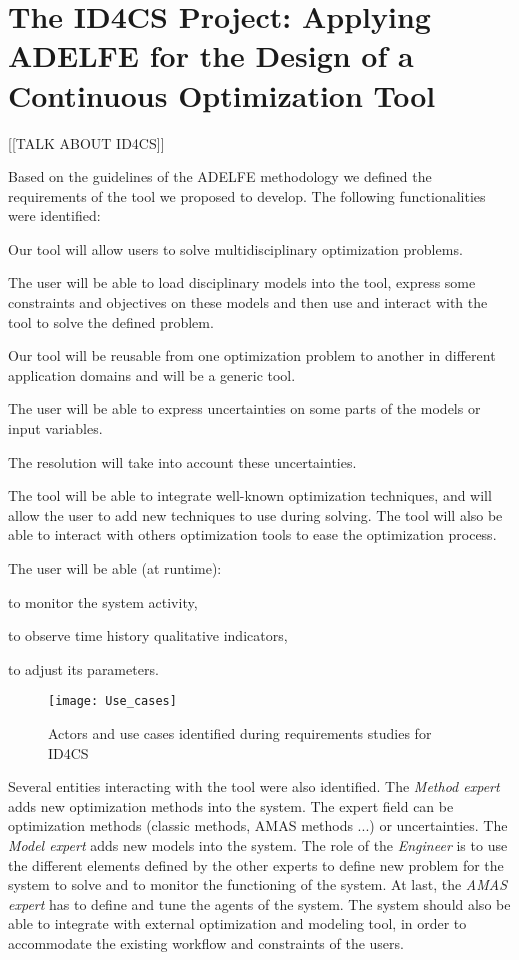 \section{The ID4CS Project: Applying ADELFE for the Design of a Continuous Optimization Tool}

[[TALK ABOUT ID4CS]]

Based on the guidelines of the ADELFE methodology we defined the requirements of the tool we proposed to develop. The following functionalities were identified:
\begin{compactitem}
\item Our tool will allow users to solve multidisciplinary optimization problems.
\item The user will be able to load disciplinary models into the tool, express some constraints and objectives on these models and then use and interact with the tool to solve the defined problem.
\item Our tool will be reusable from one optimization problem to another in different application domains and will be a generic tool.
\item The user will be able to express uncertainties on some parts of the models or input variables.
\item The resolution will take into account these uncertainties.
\item The tool will be able to integrate well-known optimization techniques, and will allow the user to add new techniques to use during solving. The tool will also be able to interact with others optimization tools to ease the optimization process.

\item The user will be able (at runtime):
	\begin{compactitem}
	\item to monitor the system activity,
	\item to observe time history qualitative indicators,
	\item to adjust its parameters.
	\end{compactitem}
\end{compactitem}

\begin{figure}
\centering
\texttt{[image: Use\_cases]}
\caption{Actors and use cases identified during requirements studies for ID4CS}\label{Use_cases}
\end{figure}

Several entities interacting with the tool were also identified. The \emph{Method expert} adds new optimization methods into the system. The expert field can be optimization methods (classic methods, AMAS methods ...) or uncertainties. The \emph{Model expert} adds new models into the system. The role of the \emph{Engineer} is to use the different elements defined by the other experts to define new problem for the system to solve and to monitor the functioning of the system. At last, the \emph{AMAS expert} has to define and tune the agents of the system. The system should also be able to integrate with external optimization and modeling tool, in order to accommodate the existing workflow and constraints of the users.

